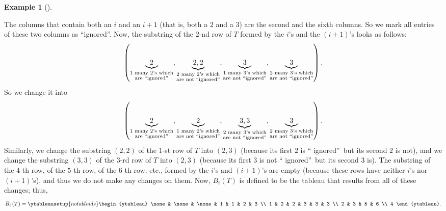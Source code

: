 \documentclass[numbers=enddot,12pt,final,onecolumn,notitlepage]{scrartcl}%
\theoremstyle{definition}
\newtheorem{exmp}[theo]{Example}
\newenvironment{example}[1][]
{\begin{exmp}[#1]\begin{leftbar}}
{\end{leftbar}\end{exmp}}
\begin{document}
\begin{example}
The columns that contain both an $i$ and an $i+1$ (that is, both a $2$ and a
$3$) are the second and the sixth columns. So we mark all entries of these two
columns as \textquotedblleft ignored\textquotedblright. Now, the substring of
the $2$-nd row of $T$ formed by the $i$'s and the $\left(  i+1\right)  $'s
looks as follows:%
\[
\left(  \underbrace{2}_{\substack{1\text{ many }2\text{'s which}\\\text{are
\textquotedblleft ignored\textquotedblright}}},\underbrace{2,2}%
_{\substack{2\text{ many }2\text{'s which}\\\text{are not \textquotedblleft
ignored\textquotedblright}}},\underbrace{3}_{\substack{1\text{ many }3\text{'s
which}\\\text{are not \textquotedblleft ignored\textquotedblright}%
}},\underbrace{3}_{\substack{2\text{ many }3\text{'s which}\\\text{are not
\textquotedblleft ignored\textquotedblright}}}\right)  .
\]
So we change it into%
\[
\left(  \underbrace{2}_{\substack{1\text{ many }2\text{'s which}\\\text{are
\textquotedblleft ignored\textquotedblright}}},\underbrace{2}%
_{\substack{1\text{ many }2\text{'s which}\\\text{are not \textquotedblleft
ignored\textquotedblright}}},\underbrace{3,3}_{\substack{2\text{ many
}3\text{'s which}\\\text{are not \textquotedblleft ignored\textquotedblright}%
}},\underbrace{3}_{\substack{2\text{ many }3\text{'s which}\\\text{are not
\textquotedblleft ignored\textquotedblright}}}\right)  .
\]
Similarly, we change the substring $\left(  2,2\right)  $ of the $1$-st row of
$T$ into $\left(  2,3\right)  $ (because its first $2$ is \textquotedblleft
ignored\textquotedblright\ but its second $2$ is not), and we change the
substring $\left(  3,3\right)  $ of the $3$-rd row of $T$ into $\left(
2,3\right)  $ (because its first $3$ is not \textquotedblleft
ignored\textquotedblright\ but its second $3$ is). The substring of the $4$-th
row, of the $5$-th row, of the $6$-th row, etc., formed by the $i$'s and
$\left(  i+1\right)  $'s are empty (because these rows have neither $i$'s nor
$\left(  i+1\right)  $'s), and thus we do not make any changes on them. Now,
$B_{i}\left(  T\right)  $ is defined to be the tableau that results from all
of these changes; thus,%
\[
B_{i}\left(  T\right)  =%
\ytableausetup{notabloids}
\begin{ytableau}
\none& \none& \none& 1 & 1 & 2 & 3 \\
1 & 2 & 2 & 3 & 3 & 3 \\
2 & 3 & 5 & 6 \\
4
\end{ytableau}%
.
\]

\end{example}
\end{document}
